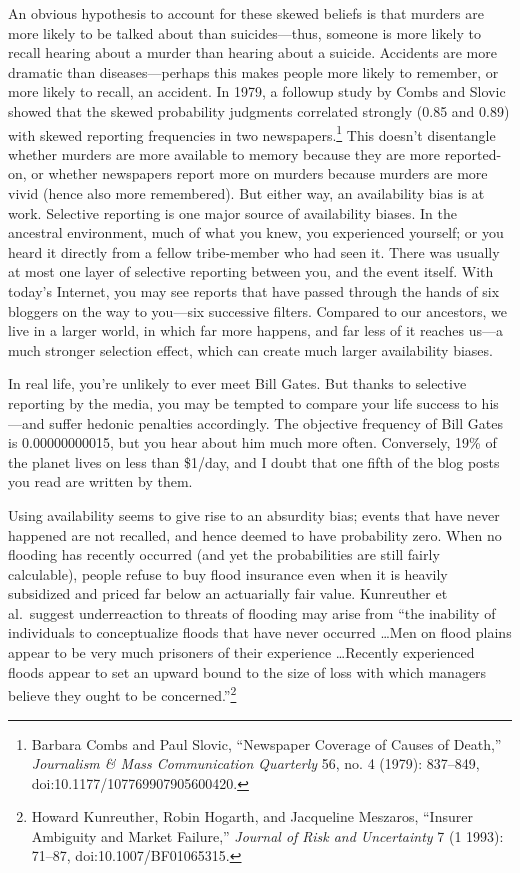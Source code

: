 {
 An obvious hypothesis to account for these skewed beliefs is that
murders are more likely to be talked about than suicides---thus,
someone is more likely to recall hearing about a murder than hearing
about a suicide. Accidents are more dramatic than diseases---perhaps
this makes people more likely to remember, or more likely to recall, an
accident. In 1979, a followup study by Combs and Slovic showed that the
skewed probability judgments correlated strongly (0.85 and 0.89) with
skewed reporting frequencies in two newspapers.\footnote{Barbara Combs and Paul Slovic, ``Newspaper
Coverage of Causes of Death,'' \textit{Journalism \&
Mass Communication Quarterly} 56, no. 4 (1979): 837--849,
doi:10.1177/107769907905600420.} This
doesn't disentangle whether murders are more available
to memory because they are more reported-on, or whether newspapers
report more on murders because murders are more vivid (hence also more
remembered). But either way, an availability bias is at work. Selective
reporting is one major source of availability biases. In the ancestral
environment, much of what you knew, you experienced yourself; or you
heard it directly from a fellow tribe-member who had seen it. There was
usually at most one layer of selective reporting between you, and the
event itself. With today's Internet, you may see
reports that have passed through the hands of six bloggers on the way
to you---six successive filters. Compared to our ancestors, we live in
a larger world, in which far more happens, and far less of it reaches
us---a much stronger selection effect, which can create much larger
availability biases.}

{
 In real life, you're unlikely to ever meet Bill
Gates. But thanks to selective reporting by the media, you may be
tempted to compare your life success to his---and suffer hedonic
penalties accordingly. The objective frequency of Bill Gates is
0.00000000015, but you hear about him much more often. Conversely, 19\%
of the planet lives on less than \$1/day, and I doubt that one fifth of
the blog posts you read are written by them.}

{
 Using availability seems to give rise to an absurdity bias; events
that have never happened are not recalled, and hence deemed to have
probability zero. When no flooding has recently occurred (and yet the
probabilities are still fairly calculable), people refuse to buy flood
insurance even when it is heavily subsidized and priced far below an
actuarially fair value. Kunreuther et al.~suggest underreaction to
threats of flooding may arise from ``the inability of
individuals to conceptualize floods that have never occurred \ldots Men
on flood plains appear to be very much prisoners of their experience
\ldots Recently experienced floods appear to set an upward bound to the
size of loss with which managers believe they ought to be
concerned.''\footnote{Howard Kunreuther, Robin Hogarth, and Jacqueline Meszaros,
``Insurer Ambiguity and Market
Failure,'' \textit{Journal of Risk and Uncertainty} 7
(1 1993): 71--87, doi:10.1007/BF01065315.}}


